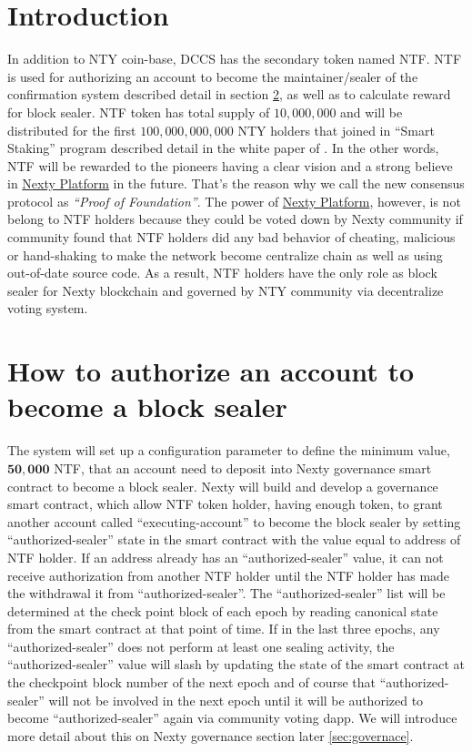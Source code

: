 \documentclass[12pt,oneside]{amsart}
\begin{document}
\setlength{\columnsep}{20pt}
\begin{multicols}{2}

\section{Introduction}\label{sec:introduction}
In addition to {\small NTY} coin-base, {\small DCCS} has the secondary token named {\small NTF}. {\small NTF} is used for authorizing an account to become the maintainer/sealer of the confirmation system described detail in section \ref{sec:authorize}, as well as to calculate reward for block sealer. {\small NTF} token has total supply of $10,000,000$ and will be distributed for the first $100,000,000,000$ NTY holders that joined in ``Smart Staking'' program described detail in the white paper of \cite{smart-taking}. In the other words, {\small NTF} will be rewarded to the pioneers having a clear vision and a strong believe in \href{https://nexty.io}{Nexty Platform} in the future. That's the reason why we call the new consensus protocol as \textit{``Proof of Foundation''}. The power of \href{https://nexty.io}{Nexty Platform}, however, is not belong to {\small NTF} holders because they could be voted down by Nexty community if community found that {\small NTF} holders did any bad behavior of cheating, malicious or hand-shaking to make the network become centralize chain as well as using out-of-date source code. As a result, {\small NTF} holders have the only role as block sealer for Nexty blockchain and governed  by {\small NTY} community via decentralize voting system.

\section{How to authorize an account to become a block sealer}\label{sec:authorize}
The system will set up a configuration parameter to define the minimum value, $\mathbf{50,000}$ {\small NTF}, that an account need to deposit into Nexty governance smart contract to become a block sealer. Nexty will build and develop a governance smart contract, which allow {\small NTF} token holder, having enough token, to grant another account called ``executing-account'' to become the block sealer by setting ``authorized-sealer'' state in the smart contract with the value equal to address of {\small NTF} holder. If an address already has an ``authorized-sealer'' value, it can not receive authorization from another NTF holder until the NTF holder has made the withdrawal it from ``authorized-sealer''. The ``authorized-sealer'' list will be determined at the check point block of each epoch by reading canonical state from the smart contract at that point of time. If in the last three epochs, any ``authorized-sealer'' does not perform at least one sealing activity, the ``authorized-sealer'' value will slash by updating the state of the smart contract at the checkpoint block number of the next epoch and of course that ``authorized-sealer'' will not be involved in the next epoch until it will be authorized to become ``authorized-sealer'' again via community voting dapp. We will introduce more detail about this on Nexty governance section later \ref{sec:governace}.


\end{multicols}
\end{document}
